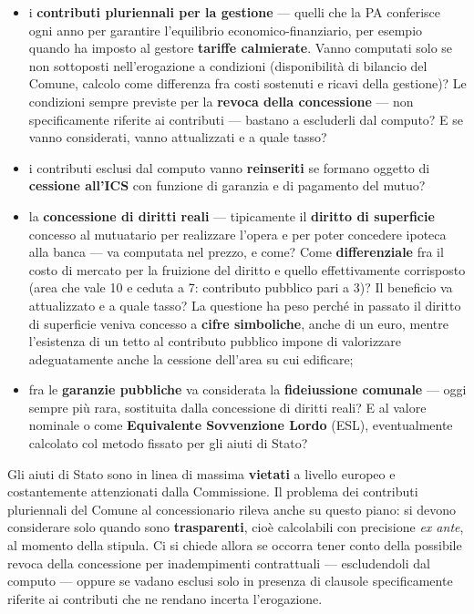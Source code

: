 \begin{itemize}
  \item i \textbf{contributi pluriennali per la gestione} --- quelli che la PA conferisce ogni anno
    per garantire l'equilibrio economico-finanziario, per esempio quando ha imposto al gestore
    \textbf{tariffe calmierate}. Vanno computati solo se non sottoposti nell'erogazione a
    condizioni (disponibilità di bilancio del Comune, calcolo come differenza fra costi sostenuti e
    ricavi della gestione)? Le condizioni sempre previste per la \textbf{revoca della concessione}
    --- non specificamente riferite ai contributi --- bastano a escluderli dal computo? E se vanno
    considerati, vanno attualizzati e a quale tasso?
  \item i contributi esclusi dal computo vanno \textbf{reinseriti} se formano oggetto di
    \textbf{cessione all'ICS} con funzione di garanzia e di pagamento del mutuo?
  \item la \textbf{concessione di diritti reali} --- tipicamente il \textbf{diritto di superficie}
    concesso al mutuatario per realizzare l'opera e per poter concedere ipoteca alla banca --- va
    computata nel prezzo, e come? Come \textbf{differenziale} fra il costo di mercato per la
    fruizione del diritto e quello effettivamente corrisposto (area che vale 10 e ceduta a 7:
    contributo pubblico pari a 3)? Il beneficio va attualizzato e a quale tasso? La questione ha
    peso perché in passato il diritto di superficie veniva concesso a \textbf{cifre simboliche},
    anche di un euro, mentre l'esistenza di un tetto al contributo pubblico impone di valorizzare
    adeguatamente anche la cessione dell'area su cui edificare;
  \item fra le \textbf{garanzie pubbliche} va considerata la \textbf{fideiussione comunale} --- oggi
    sempre più rara, sostituita dalla concessione di diritti reali? E al valore nominale o come
    \textbf{Equivalente Sovvenzione Lordo} (ESL), eventualmente calcolato col metodo fissato per gli
    aiuti di Stato?
\end{itemize}


Gli aiuti di Stato sono in linea di massima \textbf{vietati} a livello europeo e costantemente
attenzionati dalla Commissione. Il problema dei contributi pluriennali del Comune al concessionario
rileva anche su questo piano: si devono considerare solo quando sono \textbf{trasparenti}, cioè
calcolabili con precisione \textit{ex ante}, al momento della stipula. Ci si chiede allora se
occorra tener conto della possibile revoca della concessione per inadempimenti contrattuali ---
escludendoli dal computo --- oppure se vadano esclusi solo in presenza di clausole specificamente
riferite ai contributi che ne rendano incerta l'erogazione.

